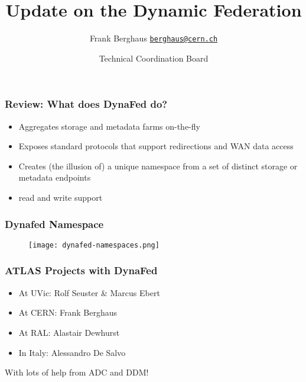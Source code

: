 \documentclass{beamer}
\title{Update on the Dynamic Federation}
\date[ISPN ’80]{Technical Coordination Board}
\author[Euclid]{Frank Berghaus \href{mailto:berghaus@cern.ch}{\texttt{berghaus@cern.ch}}}
\begin{document}
\begin{frame}
\titlepage
\end{frame}


\begin{frame}
\frametitle{Review: What does DynaFed do?}
\begin{itemize}
\item Aggregates storage and metadata farms on-the-fly
\item Exposes standard protocols that support redirections and WAN data access
\item Creates (the illusion of) a unique namespace from a set of distinct storage or metadata endpoints
\item read and write support
\end{itemize}
\end{frame}

\begin{frame}
  \frametitle{Dynafed Namespace}
  \begin{figure}
      \centering
      \texttt{[image: dynafed-namespaces.png]}
  \end{figure}
\end{frame}

\begin{frame}
  \frametitle{ATLAS Projects with DynaFed}
  \begin{itemize}
    \item At UVic: Rolf Seuster \& Marcus Ebert
    \item At CERN: Frank Berghaus
    \item At RAL: Alastair Dewhurst
    \item In Italy: Alessandro De Salvo
  \end{itemize}
  With lots of help from ADC and DDM!
\end{frame}
\end{document}
